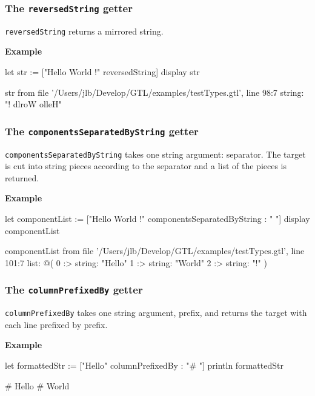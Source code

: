 \documentclass[10pt,openright,twosides,final]{memoir}
\newcommand{\gtlarg}[1]{{\footnotesize\ttfamily\colorbox{light-blue}{#1}}}
\newcommand{\gtlinline}[1]{\colorbox{light-blue}{\lstinline[language=gtl]{#1}}}
\newcommand{\example}{\vspace{.75em}\noindent\textbf{Example}\vspace{0em}}
\begin{document}
\subsubsection{The \texttt{reversedString} getter}

\gtlinline{reversedString} returns a mirrored string.

\example
\begin{gtl}
let str := ["Hello World !" reversedString]
display str
\end{gtl}
\begin{console}
str from file '/Users/jlb/Develop/GTL/examples/testTypes.gtl', line 98:7
    string: "! dlroW olleH"
\end{console}

\subsubsection{The \texttt{componentsSeparatedByString} getter}

\gtlinline{componentsSeparatedByString} takes one string argument: \gtlarg{separator}. The target is cut into string pieces according to the \gtlarg{separator} and a list of the pieces is returned.\

\example
\begin{gtl}
let componentList := ["Hello World !" componentsSeparatedByString : " "]
display componentList
\end{gtl}
\begin{console}
componentList from file '/Users/jlb/Develop/GTL/examples/testTypes.gtl', line 101:7
    list: @(
        0 :>
            string: "Hello"
        1 :>
            string: "World"
        2 :>
            string: "!"
    )
\end{console}

\subsubsection{The \texttt{columnPrefixedBy} getter}

\gtlinline{columnPrefixedBy} takes one string argument, \gtlarg{prefix}, and returns the target with each line prefixed by \gtlarg{prefix}.

\example
\begin{gtl}
let formattedStr := ["Hello\nWorld" columnPrefixedBy : "# "]
println formattedStr
\end{gtl}
\begin{console}
# Hello
# World
\end{console}
\end{document}

